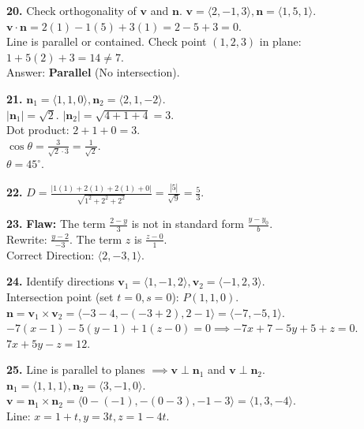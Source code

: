 \documentclass[12pt]{article}
\begin{document}
\textbf{20.} 
Check orthogonality of $\mathbf{v}$ and $\mathbf{n}$. $\mathbf{v} = \langle 2, -1, 3 \rangle, \mathbf{n} = \langle 1, 5, 1 \rangle$. \\
$\mathbf{v} \cdot \mathbf{n} = 2(1) - 1(5) + 3(1) = 2 - 5 + 3 = 0$. \\
Line is parallel or contained. Check point $(1, 2, 3)$ in plane: $1 + 5(2) + 3 = 14 \neq 7$. \\
Answer: \textbf{Parallel} (No intersection).

\textbf{21.} 
$\mathbf{n}_1 = \langle 1, 1, 0 \rangle, \mathbf{n}_2 = \langle 2, 1, -2 \rangle$. \\
$|\mathbf{n}_1| = \sqrt{2}$. $|\mathbf{n}_2| = \sqrt{4+1+4} = 3$. \\
Dot product: $2+1+0 = 3$. \\
$\cos \theta = \frac{3}{\sqrt{2} \cdot 3} = \frac{1}{\sqrt{2}}$. \\
$\theta = 45^\circ$.

\textbf{22.} 
$D = \frac{|1(1) + 2(1) + 2(1) + 0|}{\sqrt{1^2 + 2^2 + 2^2}} = \frac{|5|}{\sqrt{9}} = \frac{5}{3}$.

\textbf{23.} 
\textbf{Flaw:} The term $\frac{2-y}{3}$ is not in standard form $\frac{y-y_0}{b}$. \\
Rewrite: $\frac{y-2}{-3}$. The term $z$ is $\frac{z-0}{1}$. \\
Correct Direction: $\langle 2, -3, 1 \rangle$.

\textbf{24.} 
Identify directions $\mathbf{v}_1 = \langle 1, -1, 2 \rangle, \mathbf{v}_2 = \langle -1, 2, 3 \rangle$. \\
Intersection point (set $t=0, s=0$): $P(1, 1, 0)$. \\
$\mathbf{n} = \mathbf{v}_1 \times \mathbf{v}_2 = \langle -3-4, -(-3+2), 2-1 \rangle = \langle -7, -5, 1 \rangle$. \\
$-7(x-1) - 5(y-1) + 1(z-0) = 0 \implies -7x + 7 - 5y + 5 + z = 0$. \\
$7x + 5y - z = 12$.

\textbf{25.} 
Line is parallel to planes $\implies \mathbf{v} \perp \mathbf{n}_1$ and $\mathbf{v} \perp \mathbf{n}_2$. \\
$\mathbf{n}_1 = \langle 1, 1, 1 \rangle, \mathbf{n}_2 = \langle 3, -1, 0 \rangle$. \\
$\mathbf{v} = \mathbf{n}_1 \times \mathbf{n}_2 = \langle 0-(-1), -(0-3), -1-3 \rangle = \langle 1, 3, -4 \rangle$. \\
Line: $x = 1 + t, y = 3t, z = 1 - 4t$.
\end{document}
